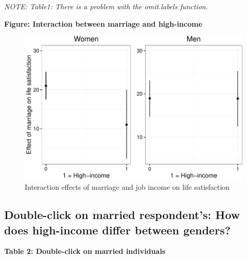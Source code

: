 \documentclass[]{article}
\begin{document}
\emph{NOTE: Table1: There is a problem with the omit.labels function.}

\textbf{Figure: Interaction between marriage and high-income}

\begin{figure}[htbp]
\centering
\includegraphics{Final_Project_P-P_analysis_Unger_files/figure-latex/unnamed-chunk-12-1.pdf}
\caption{Interaction effects of marriage and job income on life
satisfaction}
\end{figure}

\subsection{Double-click on married respondent's: How does high-income
differ between
genders?}\label{double-click-on-married-respondents-how-does-high-income-differ-between-genders}

\textbf{Table 2: Double-click on married individuals}
\end{document}
